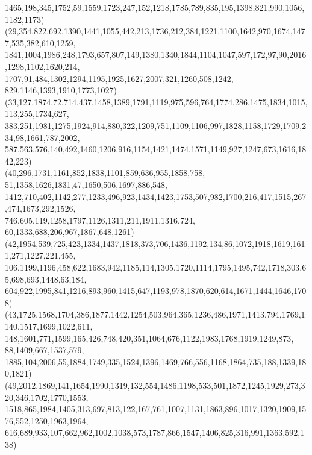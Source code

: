 \documentclass[a4paper,twopage,reqno,12pt]{amsart}
\theoremstyle{definition}
\numberwithin{equation}{section}
\begin{document}
\begin{enumerate}
{{1465,198,345,1752,59,1559,1723,247,152,1218,1785,789,835,195,1398,821,990,1056,1182,1173)\\
(29,354,822,692,1390,1441,1055,442,213,1736,212,384,1221,1100,1642,970,1674,1477,535,382,610,1259,\\
1841,1004,1986,248,1793,657,807,149,1380,1340,1844,1104,1047,597,172,97,90,2016,1298,1102,1620,214,\\
1707,91,484,1302,1294,1195,1925,1627,2007,321,1260,508,1242, 829,1146,1393,1910,1773,1027)\\
(33,127,1874,72,714,437,1458,1389,1791,1119,975,596,764,1774,286,1475,1834,1015,113,255,1734,627,\\
383,251,1981,1275,1924,914,880,322,1209,751,1109,1106,997,1828,1158,1729,1709,234,98,1661,787,2002,\\
587,563,576,140,492,1460,1206,916,1154,1421,1474,1571,1149,927,1247,673,1616,1842,223)\\
(40,296,1731,1161,852,1838,1101,859,636,955,1858,758, 51,1358,1626,1831,47,1650,506,1697,886,548,\\
1412,710,402,1142,277,1233,496,923,1434,1423,1753,507,982,1700,216,417,1515,267,474,1673,292,1526,\\
746,605,119,1258,1797,1126,1311,211,1911,1316,724, 60,1333,688,206,967,1867,648,1261)\\
(42,1954,539,725,423,1334,1437,1818,373,706,1436,1192,134,86,1072,1918,1619,1611,271,1227,221,455,\\
106,1199,1196,458,622,1683,942,1185,114,1305,1720,1114,1795,1495,742,1718,303,65,698,693,1448,63,184,\\
604,922,1995,841,1216,893,960,1415,647,1193,978,1870,620,614,1671,1444,1646,1708)\\
(43,1725,1568,1704,386,1877,1442,1254,503,964,365,1236,486,1971,1413,794,1769,1140,1517,1699,1022,611,\\
148,1601,771,1599,165,426,748,420,351,1064,676,1122,1983,1768,1919,1249,873, 88,1409,667,1537,579,\\
1885,104,2006,55,1884,1749,335,1524,1396,1469,766,556,1168,1864,735,188,1339,180,1821)\\
(49,2012,1869,141,1654,1990,1319,132,554,1486,1198,533,501,1872,1245,1929,273,320,346,1702,1770,1553,\\
1518,865,1984,1405,313,697,813,122,167,761,1007,1131,1863,896,1017,1320,1909,1576,552,1250,1963,1964,\\
616,689,933,107,662,962,1002,1038,573,1787,866,1547,1406,825,316,991,1363,592,138)\\
}}
\end{enumerate}
\end{document}

